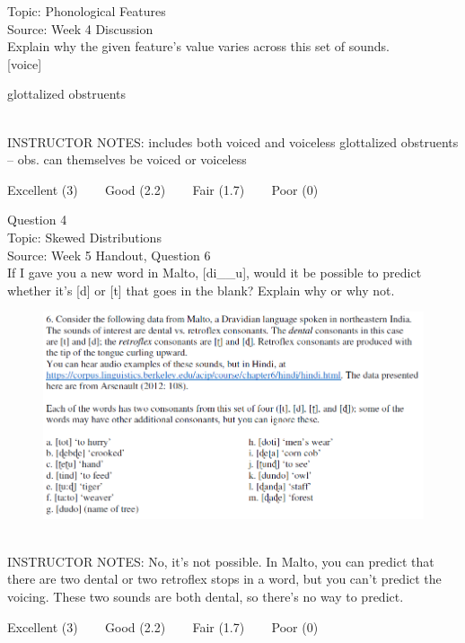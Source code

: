 \documentclass[12pt]{article}
\begin{document}
Topic: Phonological Features\\
Source: Week 4 Discussion\\

Explain why the given feature's value varies across this set of sounds.\\

{[voice]}

glottalized obstruents


~\\
INSTRUCTOR NOTES: includes both voiced and voiceless glottalized obstruents -- obs. can themselves be voiced or voiceless


\vfill
Excellent (3) ~~~ Good (2.2) ~~~ Fair (1.7) ~~~ Poor (0)
\newpage

{\large Question 4}\\

Topic: Skewed Distributions\\
Source: Week 5 Handout, Question 6\\

If I gave you a new word in Malto, [di\_\_u], would it be possible to predict whether it's [d] or [t] that goes in the blank? Explain why or why not.\\

\begin{figure}[H]
\includegraphics{../images/malto.png}
\end{figure}

~\\
INSTRUCTOR NOTES: No, it's not possible. In Malto, you can predict that there are two dental or two retroflex stops in a word, but you can't predict the voicing. These two sounds are both dental, so there's no way to predict.


\vfill
Excellent (3) ~~~ Good (2.2) ~~~ Fair (1.7) ~~~ Poor (0)
\newpage
\end{document}
